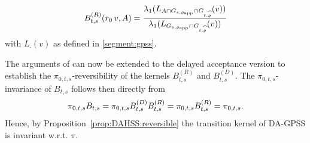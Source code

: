 \documentclass[sn-mathphys-num]{sn-jnl}%
\theoremstyle{thmstyleone}%
\theoremstyle{thmstyletwo}%
\theoremstyle{thmstylethree}%
\newcommand{\change}[1]{\bgroup\color{black}#1\egroup}    %
\begin{document}
\begin{appendices}
\[
   B^{(R)}_{t,s}(r_0\, v, A)=\frac{\lambda_1(L_{A\cap G_{s,\varrho_{\textmd{app}}}\cap G_{t,\widehat{\varrho}}}(v))}{\lambda_1(L_{G_{s,\varrho_{\textmd{app}}}\cap G_{t,\widehat{\varrho}}}(v))}  
\]
\change{with $L_{\cdot}(v)$ as defined in \eqref{segment:gpss}}.

\change{The arguments of \citet[Lemma~4.6, Theorem~4.13]{Schaer2025} can now be extended to the delayed acceptance version to establish the $\pi_{0,t,s}$-reversibility of the kernels $B^{(R)}_{t,s}$ and $B^{(D)}_{t,s}$. The $\pi_{0,t,s}$-invariance of $B_{t,s}$ follows then directly from}
\[
  \change{\pi_{0,t,s}B_{t,s}=\pi_{0,t,s}B^{(D)}_{t,s}B^{(R)}_{t,s}= \pi_{0,t,s}B^{(R)}_{t,s}=\pi_{0,t,s}.}
\]
\change{Hence, by Proposition~\ref{prop:DAHSS:reversible} the transition kernel of DA-GPSS is invariant w.r.t. $\pi$.} 


\end{appendices}
\end{document}
